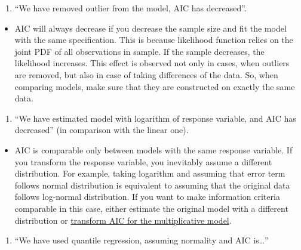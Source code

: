 \documentclass[
]{book}
\providecommand{\tightlist}{%
  \setlength{\itemsep}{0pt}\setlength{\parskip}{0pt}}
\theoremstyle{definition}
\theoremstyle{definition}
\theoremstyle{definition}
\theoremstyle{definition}
\theoremstyle{remark}
\begin{document}
\begin{enumerate}
\def\labelenumi{\arabic{enumi}.}
\setcounter{enumi}{1}
\tightlist
\item
  ``We have removed outlier from the model, AIC has decreased''.
\end{enumerate}

\begin{itemize}
\tightlist
\item
  AIC will always decrease if you decrease the sample size and fit the model with the same specification. This is because likelihood function relies on the joint PDF of all observations in sample. If the sample decreases, the likelihood increases. This effect is observed not only in cases, when outliers are removed, but also in case of taking differences of the data. So, when comparing models, make sure that they are constructed on exactly the same data.
\end{itemize}

\begin{enumerate}
\def\labelenumi{\arabic{enumi}.}
\setcounter{enumi}{2}
\tightlist
\item
  ``We have estimated model with logarithm of response variable, and AIC has decreased'' (in comparison with the linear one).
\end{enumerate}

\begin{itemize}
\tightlist
\item
  AIC is comparable only between models with the same response variable. If you transform the response variable, you inevitably assume a different distribution. For example, taking logarithm and assuming that error term follows normal distribution is equivalent to assuming that the original data follows log-normal distribution. If you want to make information criteria comparable in this case, either estimate the original model with a different distribution or \href{https://forecasting.svetunkov.ru/en/2018/03/22/comparing-additive-and-multiplicative-regressions-using-aic-in-r/}{transform AIC for the multiplicative model}.
\end{itemize}

\begin{enumerate}
\def\labelenumi{\arabic{enumi}.}
\setcounter{enumi}{3}
\tightlist
\item
  ``We have used quantile regression, assuming normality and AIC is\ldots{}''
\end{enumerate}
\end{document}
